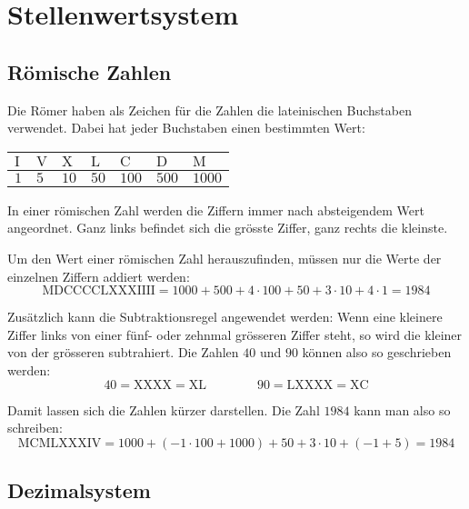 \newpage
\section{Stellenwertsystem}

\subsection{Römische Zahlen}

Die Römer haben als Zeichen für die Zahlen die lateinischen Buchstaben verwendet. Dabei hat jeder Buchstaben einen bestimmten Wert:

\begin{center}
  \begin{tabularx}{0.9\textwidth}{CCCCCCC}
  \toprule
   $\text{I}$ & $\text{V}$ & $\text{X}$ & $\text{L}$ & $\text{C}$ &  $\text{D}$ & $\text{M}$ \\
  \midrule
    $1$        & $5$        & $10$       & $50$       & $100$      & $500$      & $1000$ \\
  \bottomrule
  \end{tabularx}
\end{center}

In einer römischen Zahl werden die Ziffern immer nach absteigendem Wert angeordnet. Ganz links befindet sich die grösste Ziffer, ganz rechts die kleinste.

Um den Wert einer römischen Zahl herauszufinden, müssen nur die Werte der einzelnen Ziffern addiert werden:
\[
  \text{MDCCCCLXXXIIII} = 1000 + 500 + 4\cdot 100 + 50 + 3\cdot 10 + 4 \cdot 1 = 1984
\]

Zusätzlich kann die Subtraktionsregel angewendet werden: Wenn eine kleinere Ziffer links von einer fünf- oder zehnmal grösseren Ziffer steht, so wird die kleiner von der grösseren subtrahiert. Die Zahlen $40$ und $90$ können also so geschrieben werden:
\[
  40 = \text{XXXX} = \text{XL} \qquad\qquad 90 = \text{LXXXX} = \text{XC}
\]

Damit lassen sich die Zahlen kürzer darstellen. Die Zahl $1984$ kann man also so schreiben:
\[
  \text{MCMLXXXIV} = 1000 + (-1\cdot 100 + 1000) + 50 + 3\cdot 10 + (-1 + 5) = 1984
\]

\subsection{Dezimalsystem}

